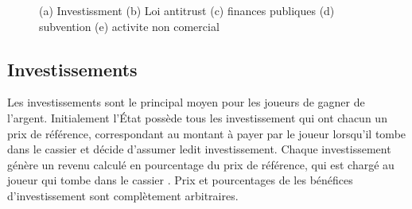 \documentclass[12pt]{article}
\begin{document}
    
    \begin{figure}
    \centering

   
    \caption{(a) Investissment (b) Loi antitrust (c) finances publiques (d) subvention (e) activite non comercial}
    \label{fig:foobar}
\end{figure}



    \subsection{Investissements}
Les investissements sont le principal moyen pour les joueurs de gagner de l'argent. Initialement
l'\'Etat possède tous les investissement qui ont chacun un prix de référence, correspondant au
montant à payer par le joueur lorsqu'il tombe dans le cassier et décide d'assumer ledit
investissement.
Chaque investissement génère un revenu calculé en pourcentage du prix de
référence, qui est chargé au joueur qui tombe dans le cassier . 
Prix et pourcentages de les bénéfices d'investissement sont complètement arbitraires.
\end{document}
